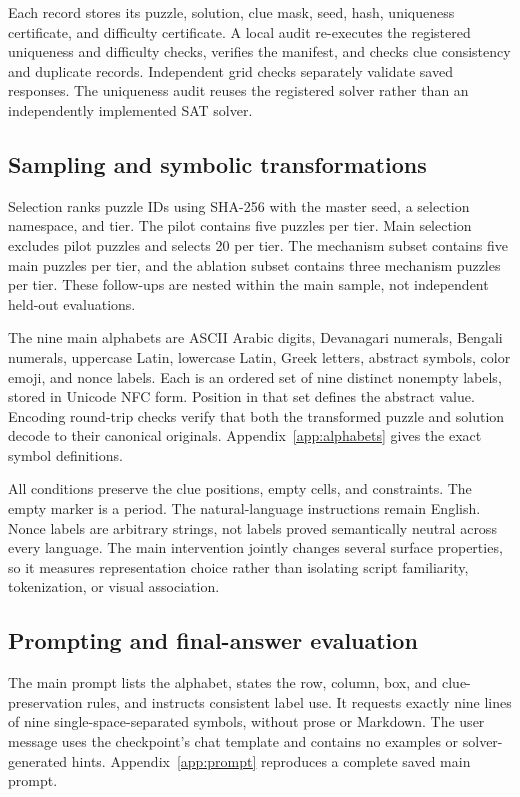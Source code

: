 \documentclass[11pt]{article}
\begin{document}
Each record stores its puzzle, solution, clue mask, seed, hash, uniqueness certificate, and difficulty certificate. A local audit re-executes the registered uniqueness and difficulty checks, verifies the manifest, and checks clue consistency and duplicate records. Independent grid checks separately validate saved responses. The uniqueness audit reuses the registered solver rather than an independently implemented SAT solver.

\subsection{Sampling and symbolic transformations}
Selection ranks puzzle IDs using SHA-256 with the master seed, a selection namespace, and tier. The pilot contains five puzzles per tier. Main selection excludes pilot puzzles and selects 20 per tier. The mechanism subset contains five main puzzles per tier, and the ablation subset contains three mechanism puzzles per tier. These follow-ups are nested within the main sample, not independent held-out evaluations.

The nine main alphabets are ASCII Arabic digits, Devanagari numerals, Bengali numerals, uppercase Latin, lowercase Latin, Greek letters, abstract symbols, color emoji, and nonce labels. Each is an ordered set of nine distinct nonempty labels, stored in Unicode NFC form. Position in that set defines the abstract value. Encoding round-trip checks verify that both the transformed puzzle and solution decode to their canonical originals. Appendix~\ref{app:alphabets} gives the exact symbol definitions.

All conditions preserve the clue positions, empty cells, and constraints. The empty marker is a period. The natural-language instructions remain English. Nonce labels are arbitrary strings, not labels proved semantically neutral across every language. The main intervention jointly changes several surface properties, so it measures representation choice rather than isolating script familiarity, tokenization, or visual association.

\subsection{Prompting and final-answer evaluation}
The main prompt lists the alphabet, states the row, column, box, and clue-preservation rules, and instructs consistent label use. It requests exactly nine lines of nine single-space-separated symbols, without prose or Markdown. The user message uses the checkpoint's chat template and contains no examples or solver-generated hints. Appendix~\ref{app:prompt} reproduces a complete saved main prompt.
\end{document}
